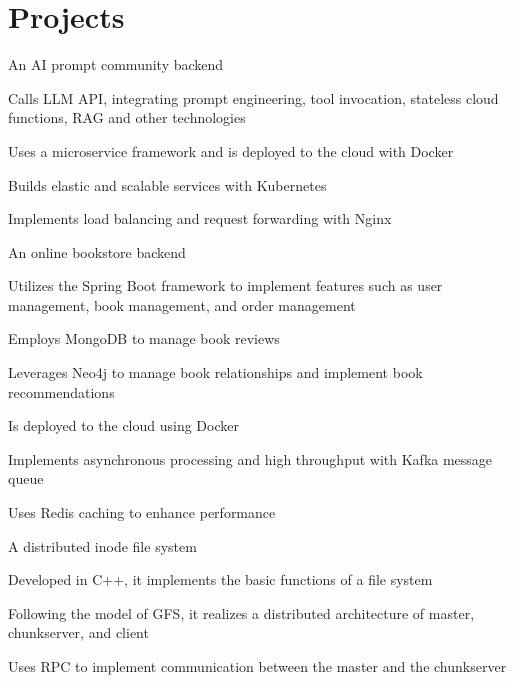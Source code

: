 \documentclass[]{deedy-resume-openfont}
\begin{document}
\begin{minipage}[t]{0.73\textwidth}

\section{Projects}
\sectionsep
{}
\sectionsep
\begin{tightemize}
    \item An AI prompt community backend
    \item Calls LLM API, integrating prompt engineering, tool invocation, stateless cloud functions, RAG and other technologies
    \item Uses a microservice framework and is deployed to the cloud with Docker
    \item Builds elastic and scalable services with Kubernetes
    \item Implements load balancing and request forwarding with Nginx
    \end{tightemize}
\sectionsep

\begin{tightemize}
    \item An online bookstore backend
    \item Utilizes the Spring Boot framework to implement features such as user management, book management, and order management
    \item Employs MongoDB to manage book reviews
    \item Leverages Neo4j to manage book relationships and implement book recommendations
    \item Is deployed to the cloud using Docker
    \item Implements asynchronous processing and high throughput with Kafka message queue
    \item Uses Redis caching to enhance performance
\end{tightemize}
\sectionsep

\begin{tightemize}
    \item A distributed inode file system
    \item Developed in C++, it implements the basic functions of a file system
    \item Following the model of GFS, it realizes a distributed architecture of master, chunkserver, and client
    \item Uses RPC to implement communication between the master and the chunkserver
\end{tightemize}
\sectionsep


\end{minipage}
\end{document}
